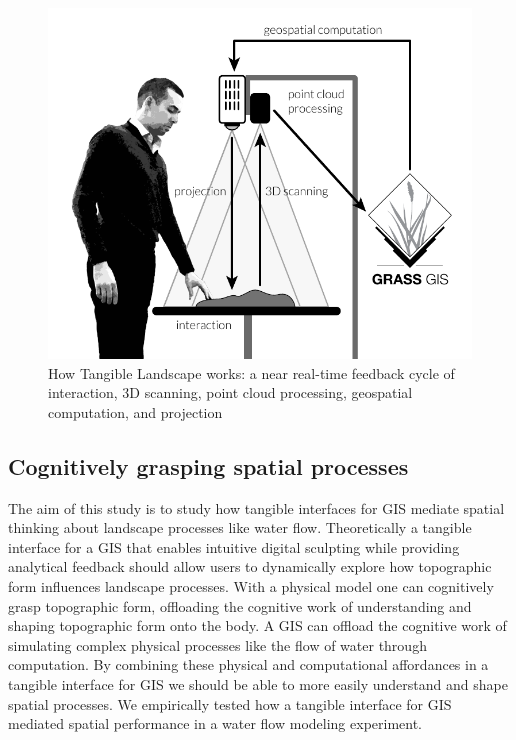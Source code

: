 \documentclass{isprs}
\begin{document}
\begin{figure}[ht!]
\begin{center}
\includegraphics[width=1.0\columnwidth]{figures/system_schema_2.pdf}
\caption{How Tangible Landscape works: a near real-time feedback cycle of interaction, 3D scanning, point cloud processing, geospatial computation, and projection}
\label{fig:system_schema}
\end{center}
\end{figure}

\subsection{Cognitively grasping spatial processes}
The aim of this study is to study how tangible interfaces for GIS 
mediate spatial thinking about landscape processes like water flow. 
Theoretically a tangible interface for a GIS that enables intuitive digital sculpting while providing analytical %
feedback should allow users to dynamically explore how topographic form influences landscape processes. 
With a physical model one can 
cognitively grasp topographic form, 
offloading the cognitive work of 
understanding and shaping topographic form onto the body. 
A GIS can offload the cognitive work of simulating complex physical processes
like the flow of water through computation. 
By combining these physical and computational affordances in a tangible interface for GIS we should be able to more easily understand and shape spatial processes. 
We empirically tested how a tangible interface for GIS 
mediated spatial performance in a water flow modeling experiment. 
\end{document}

